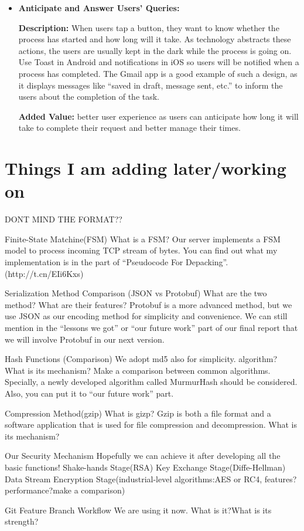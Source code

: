 \documentclass{article}
\begin{document}
\begin{itemize}
\item \textbf{Anticipate and Answer Users’ Queries:}

\textbf{Description:} When users tap a button, they want to know whether the process has started and how long will it take. As technology abstracts these actions, the users are usually kept in the dark while the process is going on. Use Toast in Android and notifications in iOS so users will be notified when a process has completed. The Gmail app is a good example of such a design, as it displays messages like “saved in draft, message sent, etc.” to inform the users about the completion of the task.

\textbf{Added Value:} better user experience as users can anticipate how long it will take to complete their request and better manage their times.
\end{itemize}

\section{Things I am adding later/working on}
DONT MIND THE FORMAT??

Finite-State Matchine(FSM)
What is a FSM?
Our server implements a FSM model to process incoming TCP stream of bytes.
You can find out what my implementation is in the part of “Pseudocode For Depacking”. (http://t.cn/EIi6Kxs)

Serialization Method Comparison (JSON vs Protobuf)
What are the two method?
What are their features?
Protobuf is a more advanced method, but we use JSON as our encoding method for simplicity and convenience. We can still mention in the “lessons we got” or “our future work” part of our final report that we will involve Protobuf in our next version.

Hash Functions (Comparison)
We adopt md5 also for simplicity. algorithm?
What is its mechanism?
Make a comparison between common algorithms. Specially, a newly developed algorithm called MurmurHash should be considered. Also, you can put it to “our future work” part.

Compression Method(gzip)
What is gizp?
Gzip is both a file format and a software application that is used for file compression and decompression.
What is its mechanism?


Our Security Mechanism
Hopefully we can achieve it after developing all the basic functions!
Shake-hands Stage(RSA)
Key Exchange Stage(Diffe-Hellman)
Data Stream Encryption Stage(industrial-level algorithms:AES or RC4, features?performance?make a comparison)

Git Feature Branch Workflow
We are using it now. What is it?What is its strength?
\end{document}

